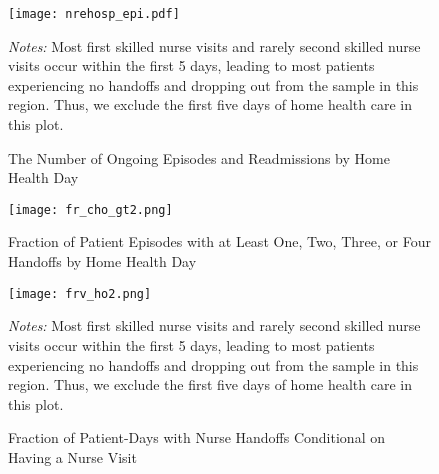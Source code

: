 \documentclass[final,12pt, notitlepage]{article}
\begin{document}
\begin{singlespace}

\graphicspath{ {/Users/kimk13/Dropbox/Wharton/Research/Labor/gph/anhandoff/} }
\newpage
\begin{figure}[H]
\centering
\texttt{[image: nrehosp\_epi.pdf]}
\begin{minipage}{\linewidth}
\footnotesize
\justify
\emph{Notes:}
Most first skilled nurse visits and rarely second skilled nurse visits occur within the first 5 days, leading to most patients experiencing no handoffs and dropping out from the sample in this region. Thus, we exclude the first five days of home health care in this plot.
\end{minipage}
\caption{The Number of Ongoing Episodes and Readmissions by Home Health Day}
\label{fig:pct_rehosp}
\end{figure}

\graphicspath{ {/Users/kimk13/Dropbox/Wharton/Research/Labor/gph/anhandoff/} }
\begin{figure}[H]
\begin{minipage}{\linewidth}
\centering
\texttt{[image: fr\_cho\_gt2.png]}
\footnotesize
\justify
\end{minipage}
\caption{Fraction of Patient Episodes with at Least One, Two, Three, or Four Handoffs by Home Health Day}
\label{fig:fr_cho_gt}
\end{figure}

\graphicspath{ {/Users/kimk13/Dropbox/Wharton/Research/Labor/gph/anhandoff/} }
\begin{figure}[H]
\centering
\texttt{[image: frv\_ho2.png]}
\begin{minipage}{\linewidth}
\footnotesize
\justify
\emph{Notes:}
Most first skilled nurse visits and rarely second skilled nurse visits occur within the first 5 days, leading to most patients experiencing no handoffs and dropping out from the sample in this region. Thus, we exclude the first five days of home health care in this plot.
\end{minipage}
\caption{Fraction of Patient-Days with Nurse Handoffs Conditional on Having a Nurse Visit}
\label{fig:frv_ho}
\end{figure}




\end{singlespace}
\end{document}
